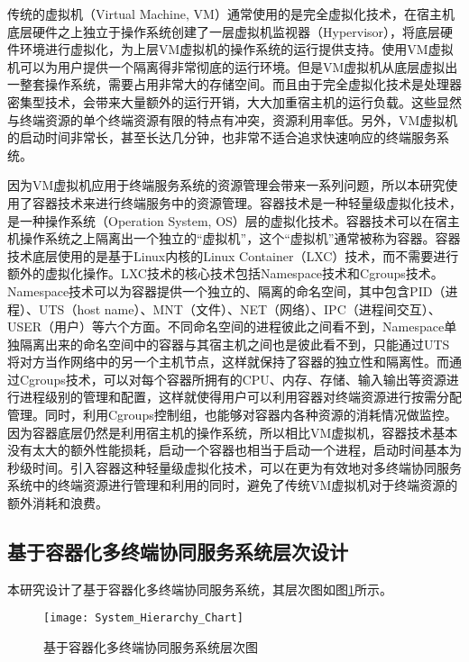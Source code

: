 传统的虚拟机（Virtual Machine, VM）通常使用的是完全虚拟化技术，在宿主机底层硬件之上独立于操作系统创建了一层虚拟机监视器（Hypervisor），将底层硬件环境进行虚拟化，为上层VM虚拟机的操作系统的运行提供支持。使用VM虚拟机可以为用户提供一个隔离得非常彻底的运行环境。但是VM虚拟机从底层虚拟出一整套操作系统，需要占用非常大的存储空间。而且由于完全虚拟化技术是处理器密集型技术，会带来大量额外的运行开销，大大加重宿主机的运行负载。这些显然与终端资源的单个终端资源有限的特点有冲突，资源利用率低。另外，VM虚拟机的启动时间非常长，甚至长达几分钟，也非常不适合追求快速响应的终端服务系统。

因为VM虚拟机应用于终端服务系统的资源管理会带来一系列问题，所以本研究使用了容器技术来进行终端服务中的资源管理。容器技术是一种轻量级虚拟化技术，是一种操作系统（Operation System, OS）层的虚拟化技术。容器技术可以在宿主机操作系统之上隔离出一个独立的“虚拟机”，这个“虚拟机”通常被称为容器。容器技术底层使用的是基于Linux内核的Linux Container（LXC）技术，而不需要进行额外的虚拟化操作。LXC技术的核心技术包括Namespace技术和Cgroups技术。Namespace技术可以为容器提供一个独立的、隔离的命名空间，其中包含PID（进程）、UTS（host name）、MNT（文件）、NET（网络）、IPC（进程间交互）、USER（用户）等六个方面。不同命名空间的进程彼此之间看不到，Namespace单独隔离出来的命名空间中的容器与其宿主机之间也是彼此看不到，只能通过UTS将对方当作网络中的另一个主机节点，这样就保持了容器的独立性和隔离性。而通过Cgroups技术，可以对每个容器所拥有的CPU、内存、存储、输入输出等资源进行进程级别的管理和配置，这样就使得用户可以利用容器对终端资源进行按需分配管理。同时，利用Cgroups控制组，也能够对容器内各种资源的消耗情况做监控。因为容器底层仍然是利用宿主机的操作系统，所以相比VM虚拟机，容器技术基本没有太大的额外性能损耗，启动一个容器也相当于启动一个进程，启动时间基本为秒级时间。引入容器这种轻量级虚拟化技术，可以在更为有效地对多终端协同服务系统中的终端资源进行管理和利用的同时，避免了传统VM虚拟机对于终端资源的额外消耗和浪费。

\subsection{基于容器化多终端协同服务系统层次设计}
本研究设计了基于容器化多终端协同服务系统，其层次图如图\ref{fig:system_hierarchy}所示。
\begin{figure}[!htbp]
    \centering
    \texttt{[image: System\_Hierarchy\_Chart]}
    \caption{基于容器化多终端协同服务系统层次图}
    \label{fig:system_hierarchy}
\end{figure}

